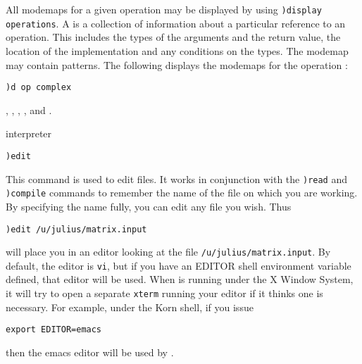 All modemaps for a given operation  may be
displayed by using {\tt )display operations}.
A  is a collection of information about  a particular
reference
to an  operation.  This  includes the  types of the  arguments and  the return
value, the  location of the  implementation and  any conditions on  the types.
The modemap may contain patterns.  The following displays the modemaps for the
operation :
\begin{verbatim}
)d op complex
\end{verbatim}

\par{}
,
,
,
, and
.




\par{} interpreter

\par{}
\begin{simpleList}
\item{\tt )edit} \ranb{}
\end{simpleList}
\par{}

This command is  used to edit files.
It works in conjunction  with the {\tt )read}
and {\tt )compile} commands to remember the name
of the file on which you are working.
By specifying the name fully, you  can edit any file you wish.
Thus
\begin{verbatim}
)edit /u/julius/matrix.input
\end{verbatim}
will place  you in an editor looking at the  file
{\tt /u/julius/matrix.input}.
By default, the editor is {\tt vi},
but if you have an EDITOR shell environment variable defined, that editor
will be used.
When \Language{} is running under the X Window System,
it will try to open a separate {\tt xterm} running your editor if
it thinks one is necessary.
For example, under the Korn shell, if you issue
\begin{verbatim}
export EDITOR=emacs
\end{verbatim}
then the emacs
editor will be used by .

